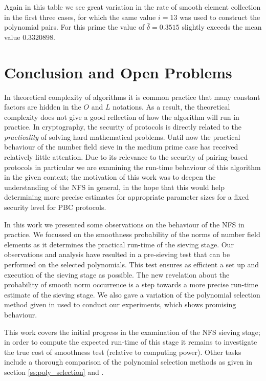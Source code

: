 \documentclass[a4paper, 12pt, envcountsect, runningheads]{llncs}
\numberwithin{figure}{section}
\numberwithin{equation}{section}
\begin{document}
Again in this table we see great variation in the rate of smooth element collection in the first three cases, for which the same value $i=13$ was used to construct the polynomial pairs. For this prime the value of $\hat{\delta}=0.3515$ slightly exceeds the mean value $0.3320898$.

\section{Conclusion and Open Problems}
\label{s:conclusion}
In theoretical complexity of algorithms it is common practice that many constant factors are hidden in the $O$ and $L$ notations. As a result, the theoretical complexity does not give a good reflection of how the algorithm will run in practice.  
In cryptography, the security of protocols is directly related to the {\em practicality} of solving hard mathematical problems. Until now the practical behaviour of the number field sieve in the medium prime case has received relatively little attention. Due to its relevance to the security of pairing-based protocols in particular we are examining the run-time behaviour of this algorithm in the given context; the motivation of this work was to deepen the understanding of the NFS in general, in the hope that this would help determining more precise estimates for appropriate parameter sizes for a fixed security level for PBC protocols. 

In this work we presented some observations on the behaviour of the NFS in practice. We focussed on the smoothness probability of the norms of number field elements as it determines the practical run-time of the sieving stage. Our observations and analysis have resulted in a pre-sieving test that can be performed on the selected polynomials. This test ensures as efficient a set up and execution of the sieving stage as possible. The new revelation about the probability of smooth norm occurrence is a step towards a more precise run-time estimate of the sieving stage. We also gave a variation of the polynomial selection method given in \cite{joux-lercier-smart-vercauteren06} used to conduct our experiments, which shows promising behaviour.

This work covers the initial progress in the examination of the NFS sieving stage; in order to compute the expected run-time of this stage it remains to investigate the true cost of smoothness test (relative to computing power). Other tasks include a thorough comparison of the polynomial selection methods as given in section \ref{ss:poly_selection} and \cite{joux-lercier-smart-vercauteren06}. 
\end{document}
